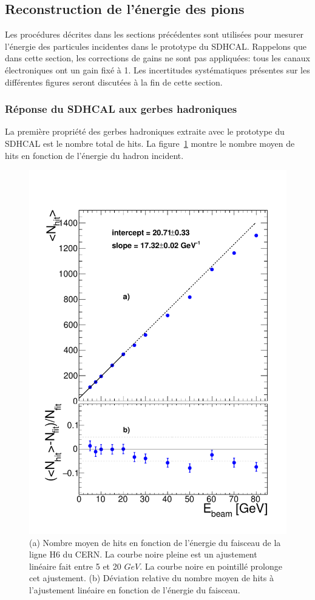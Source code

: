 \subsection{Reconstruction de l'énergie des pions}
\label{sec.ereco}
Les procédures décrites dans les sections précédentes sont utilisées pour mesurer l’énergie des particules incidentes dans le prototype du SDHCAL. Rappelons que dans cette section, les corrections de gains ne sont pas appliquées: tous les canaux électroniques ont un gain fixé à 1. Les incertitudes systématiques présentes sur les différentes figures seront discutées à la fin de cette section.
\subsubsection{Réponse du SDHCAL aux gerbes hadroniques}
La première propriété des gerbes hadroniques extraite avec le prototype du SDHCAL est le nombre total de hits. La figure~\ref{fig:nhitLin} montre le nombre moyen de hits en fonction de l'énergie du hadron incident.
\begin{figure}[!ht]
  \begin{center}
    \includegraphics[width=.5\textwidth]{SDHCAL/figs/NHITPION.pdf}
    \caption{(a) Nombre moyen de hits en fonction de l'énergie du faisceau de la ligne H6 du CERN. La courbe noire pleine est un ajustement linéaire fait entre 5 et 20 $GeV$. La courbe noire en pointillé prolonge cet ajustement. (b) Déviation relative du nombre moyen de hits à l'ajustement linéaire en fonction de l'énergie du faisceau.}
    \label{fig:nhitLin}
  \end{center}
\end{figure}
